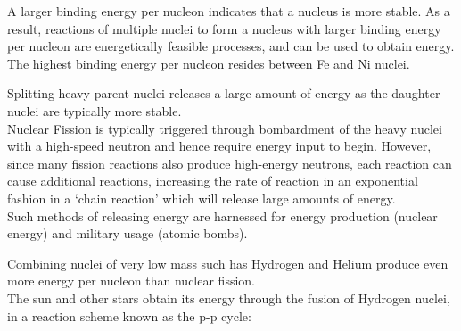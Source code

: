 \documentclass[../main]{subfiles}
\begin{document}

	A larger binding energy per nucleon indicates that a nucleus is more stable. As a result, reactions of multiple nuclei to form a nucleus with larger binding energy per nucleon are energetically feasible processes, and can be used to obtain energy. \\

	The highest binding energy per nucleon resides between Fe and Ni nuclei. \\




	Splitting heavy parent nuclei releases a large amount of energy as the daughter nuclei are typically more stable. \\

	Nuclear Fission is typically triggered through bombardment of the heavy nuclei with a high-speed neutron and hence require energy input to begin. However, since many fission reactions also produce high-energy neutrons, each reaction can cause additional reactions, increasing the rate of reaction in an exponential fashion in a `chain reaction' which will release large amounts of energy. \\

	Such methods of releasing energy are harnessed for energy production (nuclear energy) and military usage (atomic bombs). \\



	Combining nuclei of very low mass such has Hydrogen and Helium produce even more energy per nucleon than nuclear fission. \\

	The sun and other stars obtain its energy through the fusion of Hydrogen nuclei, in a reaction scheme known as the p-p cycle:
\end{document}
